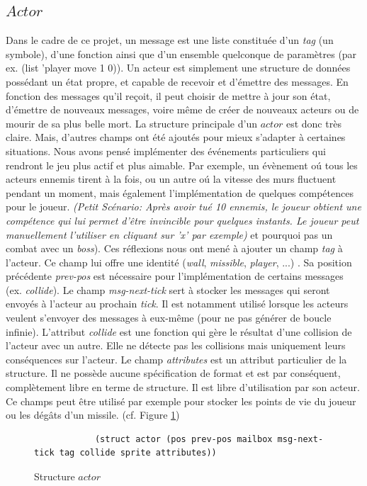 \documentclass{article}
\begin{document}
\subsection{$Actor$}
Dans le cadre de ce projet, un message est une liste constituée d'un \textit{tag} (un symbole), d'une fonction ainsi que d'un ensemble quelconque de paramètres (par ex. (list 'player move 1 0)). Un acteur est simplement une structure de données possédant un état propre, et capable de recevoir et d'émettre des messages. En fonction des messages qu'il reçoit, il peut choisir de mettre à jour son état, d'émettre de nouveaux messages, voire même de créer de nouveaux acteurs ou de mourir de sa plus belle mort.
La structure principale d'un $actor$ est donc très claire. Mais, d'autres champs ont été ajoutés pour mieux s'adapter à certaines situations. Nous avons pensé implémenter des événements particuliers qui rendront le jeu plus actif et plus aimable. Par exemple, un évènement o\'u tous les acteurs ennemis tirent à la fois, ou un autre o\'u la vitesse des murs fluctuent pendant un moment, mais également l'implémentation de quelques compétences pour le joueur. \textit{(Petit Scénario: Après avoir tué 10 ennemis, le joueur obtient une compétence qui lui permet d'être invincible pour quelques instants. Le joueur peut manuellement l'utiliser en cliquant sur 'x' par exemple)} et pourquoi pas un combat avec un \textit{boss}). Ces réflexions nous ont mené à ajouter un champ \textit{tag} à l'acteur. Ce champ lui offre une identité (\textit{wall}, \textit{missible},  \textit{player}, ...) . Sa position précédente \textit{prev-pos} est nécessaire pour l'implémentation de certains messages (ex. \textit{collide}).
Le champ \textit{msg-next-tick} sert à stocker les messages qui seront envoyés à l'acteur au prochain \textit{tick}. Il est notamment utilisé lorsque les acteurs veulent s'envoyer des messages à eux-même (pour ne pas générer de boucle infinie).
L'attribut \textit{collide} est une fonction qui gère le résultat d'une collision de l'acteur avec un autre. Elle ne détecte pas les collisions mais uniquement leurs conséquences sur l'acteur.
Le champ \textit{attributes} est un attribut particulier de la structure. Il ne possède aucune spécification de format et est par conséquent, complètement libre en terme de structure. Il est libre d'utilisation par son acteur. Ce champs peut être utilisé par exemple pour stocker les points de vie du joueur ou les dégâts d'un missile.
(cf. Figure \ref{fig:actor})
  \begin{figure}[h]
      \centering
        \begin{verbatim}
            (struct actor (pos prev-pos mailbox msg-next-tick tag collide sprite attributes))
        \end{verbatim}
      \caption{Structure $actor$}
      \label{fig:actor}
  \end{figure}
  
\end{document}
